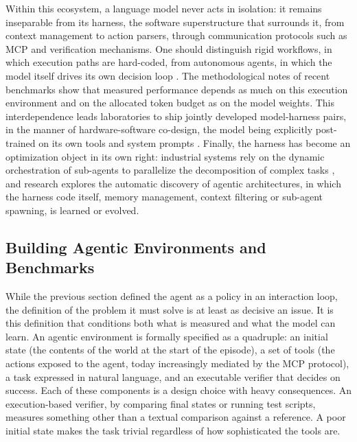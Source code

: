 \documentclass[11pt,a4paper]{article}
\begin{document}
Within this ecosystem, a language model never acts in isolation: it remains inseparable from its harness, the software superstructure that surrounds it, from context management to action parsers, through communication protocols such as MCP \cite{anthropic2024mcp} and verification mechanisms. One should distinguish rigid workflows, in which execution paths are hard-coded, from autonomous agents, in which the model itself drives its own decision loop \cite{anthropic2024agents}. The methodological notes of recent benchmarks show that measured performance depends as much on this execution environment and on the allocated token budget as on the model weights. This interdependence leads laboratories to ship jointly developed model-harness pairs, in the manner of hardware-software co-design, the model being explicitly post-trained on its own tools and system prompts \cite{anthropic2024agents, kimik2_2025}. Finally, the harness has become an optimization object in its own right: industrial systems rely on the dynamic orchestration of sub-agents to parallelize the decomposition of complex tasks \cite{kimik2_2025}, and research explores the automatic discovery of agentic architectures, in which the harness code itself, memory management, context filtering or sub-agent spawning, is learned or evolved.

\subsection{Building Agentic Environments and Benchmarks}

While the previous section defined the agent as a policy in an interaction loop, the definition of the problem it must solve is at least as decisive an issue. It is this definition that conditions both what is measured and what the model can learn. An agentic environment is formally specified as a quadruple: an initial state (the contents of the world at the start of the episode), a set of tools (the actions exposed to the agent, today increasingly mediated by the MCP protocol), a task expressed in natural language, and an executable verifier that decides on success. Each of these components is a design choice with heavy consequences. An execution-based verifier, by comparing final states or running test scripts, measures something other than a textual comparison against a reference. A poor initial state makes the task trivial regardless of how sophisticated the tools are.
\end{document}
